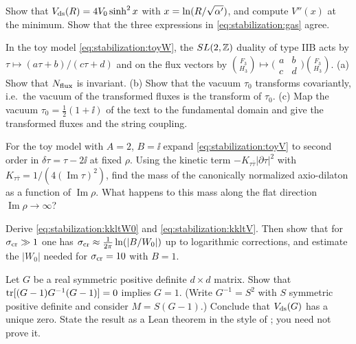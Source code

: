\begin{exercise}[$\star$]
Show that $V_{\rm ds}(R)=4V_0\sinh^2x$ with $x=\ln(R/\sqrt{\alpha'})$, and compute $V''(x)$ at the
minimum. Show that the three expressions in \eqref{eq:stabilization:gas} agree.
\end{exercise}

\begin{exercise}[$\star\star$]\label{ex:stabilization:sl2}
In the toy model \eqref{eq:stabilization:toyW}, the $SL(2,\mathbb{Z})$ duality of type IIB acts by
$\tau\mapsto(a\tau+b)/(c\tau+d)$ and on the flux vectors by
$\binom{F_3}{H_3}\mapsto\bigl(\begin{smallmatrix}a&b\\c&d\end{smallmatrix}\bigr)\binom{F_3}{H_3}$.
(a) Show that $N_{\rm flux}$ is invariant. (b) Show that the vacuum
$\tau_0$ transforms covariantly, i.e.\ the vacuum of the transformed fluxes is the transform of
$\tau_0$. (c) Map the vacuum $\tau_0=\tfrac12(1+\ii)$ of the text to the fundamental domain and
give the transformed fluxes and the string coupling.
\end{exercise}

\begin{exercise}[$\star\star$]
For the toy model with $A=2$, $B=\ii$ expand \eqref{eq:stabilization:toyV} to second order in
$\delta\tau=\tau-2\ii$ at fixed $\rho$. Using the kinetic term
$-K_{\tau\bar\tau}|\partial\tau|^2$ with $K_{\tau\bar\tau}=1/(4(\operatorname{Im}\tau)^2)$, find
the mass of the canonically normalized axio-dilaton as a function of $\operatorname{Im}\rho$.
What happens to this mass along the flat direction $\operatorname{Im}\rho\to\infty$?
\end{exercise}

\begin{exercise}[$\star\star$]
Derive \eqref{eq:stabilization:kkltW0} and \eqref{eq:stabilization:kkltV}. Then show that
for $\sigma_{\rm cr}\gg1$ one has $\sigma_{\rm cr}\approx\frac{1}{2\pi}\ln(|B/W_0|)$ up to
logarithmic corrections, and estimate the $|W_0|$ needed for $\sigma_{\rm cr}=10$ with $B=1$.
\end{exercise}

\begin{exercise}[$\star\star$]\label{ex:stabilization:unique}
Let $G$ be a real symmetric positive definite $d\times d$ matrix. Show that
$\operatorname{tr}[(G-1)G^{-1}(G-1)]=0$ implies $G=1$. (Write $G^{-1}=S^2$ with $S$ symmetric positive
definite and consider $M=S(G-1)$.) Conclude that $V_{\rm ds}(G)$ has a unique zero. State the
result as a Lean theorem in the style of ; you need not prove it.
\end{exercise}

